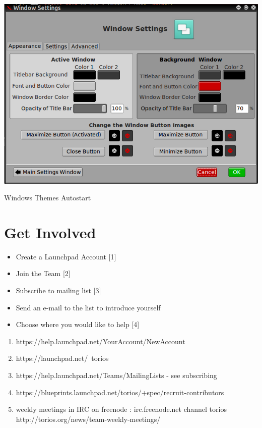\documentclass[12pt,a4paper]{book}
\begin{document}
\begin{center}
\includegraphics[width=0.7\linewidth]{window-settings}
\end{center}


{Windows}
{Themes}
{Autostart}


\newpage

\subsection{}

\chapter{Get Involved}

\begin{itemize}
\item{Create a Launchpad Account [1]}
\item{Join the Team [2]}
\item{Subscribe to mailing list [3]}
\item{Send an e-mail to the list to introduce yourself}
\item{Choose where you would like to help [4]}
\end{itemize}


\begin{enumerate}
\item {https://help.launchpad.net/YourAccount/NewAccount}
\item {https://launchpad.net/~torios}
\item {https://help.launchpad.net/Teams/MailingLists - see subscribing}
\item{https://blueprints.launchpad.net/torios/+spec/recruit-contributors}
\item{weekly meetings in IRC on freenode : irc.freenode.net  channel torios http://torios.org/news/team-weekly-meetings/ }

\end{enumerate}
\end{document}
